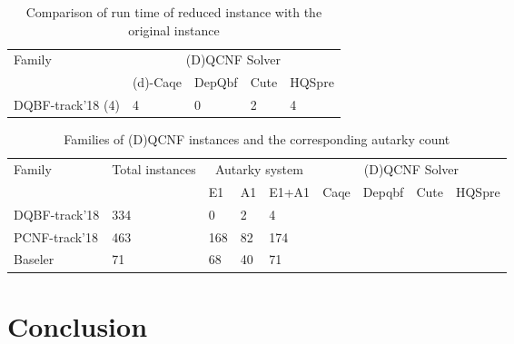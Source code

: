 \documentclass[runningheads]{llncs}
\begin{document}
\begin{table}
\caption{Comparison of run time of reduced instance with the original instance}\label{tab:solver-cmp}
\begin{tabular}{l|l|l|l|l}

\hline
    \multirow{2}{3cm}{Family}  & \multicolumn{4}{c}{(D)QCNF Solver} \\
    \cline{2-5}
   & (d)-Caqe & DepQbf & Cute & HQSpre  \\
    
\hline

DQBF-track'18 (4) &  4 & 0 & 2 & 4 \\

\hline
\end{tabular}
\end{table}

\begin{table}
\caption{Families of (D)QCNF instances and the corresponding autarky count}\label{tab:aut-results}
\begin{tabular}{l|l|l|l|l|l|l|l|l}

\hline
    \multirow{2}{3cm}{Family} &  \multirow{2}{2cm}{Total instances} & \multicolumn{3}{c}{Autarky system} & \multicolumn{4}{c}{(D)QCNF Solver} \\
    \cline{3-9}
   & & E1 & A1 & E1+A1 & Caqe& Depqbf & Cute & HQSpre\\
    
\hline

DQBF-track'18 &  334 & 0 & 2 & 4 \\ \hline
PCNF-track'18 &  463 & 168 & 82 & 174 \\ \hline
Baseler & 71 & 68 & 40 & 71 \\
 

\hline
\end{tabular}
\end{table}

\section{Conclusion}
\label{sec:conclusion}



\end{document}
